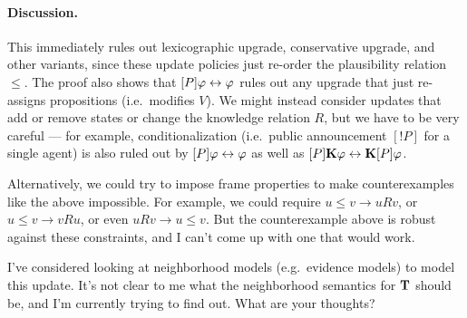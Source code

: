 \documentclass[letterpaper]{article}
\begin{document}
\paragraph*{Discussion.} This immediately rules out lexicographic upgrade, conservative upgrade, and other variants, since these update policies just re-order the plausibility relation $\leq$.  The proof also shows that $[P] \varphi \leftrightarrow \varphi$ rules out any upgrade that just re-assigns propositions (i.e.\ modifies $V$).  We might instead consider updates that add or remove states or change the knowledge relation $R$, but we have to be very careful --- for example, conditionalization (i.e.\ public announcement $[!P]$ for a single agent) is also ruled out by $[P] \varphi \leftrightarrow \varphi$ as well as $[P] \textrm{\textup{\textbf{K}}} \varphi \leftrightarrow \textrm{\textup{\textbf{K}}} [P] \varphi$.

Alternatively, we could try to impose frame properties to make counterexamples like the above impossible.  For example, we could require $u \leq v \to u{R}v$, or $u \leq v \to v{R}u$, or even $u{R}v \to u \leq v$.  But the counterexample above is robust against these constraints, and I can't come up with one that would work.

I've considered looking at neighborhood models (e.g.\ evidence models) to model this update.  It's not clear to me what the neighborhood semantics for $\textrm{\textup{\textbf{T}}}$ should be, and I'm currently trying to find out.  What are your thoughts?

\printbibliography
\end{document}
